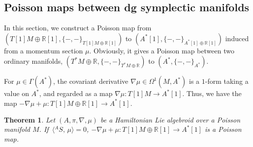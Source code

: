 \documentclass[10pt,a4paper]{amsart}
\numberwithin{equation}{section}
\newtheorem{Theorem}{Theorem}[section]
\def\bR{{\mathbb{R}}}
\newcommand{\bracket}[2]{\langle #1,\,#2\rangle}
\newcommand{\baS}{{{}^A S}}
\begin{document}
\subsection{Poisson maps between dg symplectic manifolds}\label{sec:Poissonmap}

In this section, we construct a Poisson map from
$(T[1]M \oplus \bR[1], \{-,-\}_{T[1]M \oplus \bR[1]})$
to $(A^*[1],\allowbreak \{-, -\}_{{A^*[1] \oplus \bR[1]}})$ induced from a momentum section $\mu$.
Obviously, it gives
a Poisson map between two ordinary manifolds, $(T^*M \oplus \bR, \{-,-\}_{T^*M \oplus \bR})$ to $(A^*, \{-, -\}_{A^*})$.


For $\mu \in \Gamma(A^*)$, the covariant derivative
$\nabla \mu \in \Omega^1(M, A^*)$
is a $1$-form taking a value on $A^*$, and
regarded as a map $\nabla \mu\colon T[1]M \rightarrow A^*[1]$.
Thus, we have the map $-\nabla \mu + \mu\colon T[1]M \oplus \bR[1]
\rightarrow A^*[1]$.






\begin{Theorem}\label{ThPoismap}
Let $(A, \pi, \nabla, \mu)$ be a Hamiltonian Lie algebroid over a Poisson manifold $M$.
If~${\bracket{\baS}{\mu} =0}$,
$-\nabla \mu + \mu\colon T[1]M \oplus \bR[1] \rightarrow A^*[1]$
is a Poisson map.
\end{Theorem}
\end{document}
